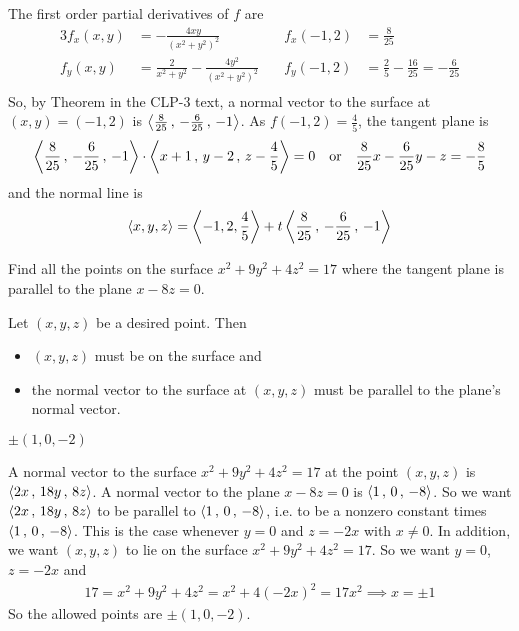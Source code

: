 \begin{solution}
The first order partial derivatives of $f$ are
\begin{alignat*}{3}
f_x(x,y) & = -\frac{4xy}{{(x^2+y^2)}^2}\quad &
      f_x(-1,2) & = \frac{8}{25} \\
f_y(x,y) & = \frac{2}{x^2+y^2}-\frac{4y^2}{{(x^2+y^2)}^2}\quad &
      f_y(-1,2) & = \frac{2}{5}-\frac{16}{25}
                  =-\frac{6}{25} \\
\end{alignat*}
So, by Theorem  in the CLP-3 text, 
a normal vector to the surface at $(x,y)=(-1,2)$ is
$\left< \frac{8}{25}\,,\,-\frac{6}{25}\,,\,-1\right>$.
As $f(-1,2)= \frac{4}{5}$, the tangent plane is
\begin{align*}
\llt \frac{8}{25}\,,\,-\frac{6}{25}\,,\,-1\rgt\cdot\llt x+1\,,\,y-2\,,\,
         z -\frac{4}{5}\rgt=0\quad \text{or}\quad
\frac{8}{25}x-\frac{6}{25}y-z=-\frac{8}{5} %
\end{align*} 
and the normal line is
\begin{align*}
\left< x,y,z\right> = \left< -1,2,\frac{4}{5}\right> 
                  +t \left< \frac{8}{25}\,,\,-\frac{6}{25}\,,\,-1\right>
\end{align*}
\end{solution}

\begin{question}[M200 2013D] %
Find all the points on the surface $x^2 + 9y^2 + 4z^2 = 17$ 
where the tangent plane is parallel to the plane $x - 8z = 0$.
\end{question}

\begin{hint}
Let $(x,y,z)$ be a desired point. Then  
\begin{itemize}\itemsep1pt \parskip0pt  %
\item 
$(x,y,z)$ must be on the surface and
\item
the normal vector to the surface at $(x,y,z)$ must be parallel to the
plane's normal vector.
\end{itemize}
\end{hint}

\begin{answer}
$\pm(1,0,-2)$
\end{answer}

\begin{solution}
A normal vector to the surface $x^2 + 9y^2 + 4z^2 = 17$
at the point $(x,y,z)$ is $\left< 2x\,,\, 18y\,,\,8z\right>$. 
A normal vector to the plane $x - 8z = 0$ is $\left< 1\,,\,0\,,\,-8\right>$.
So we want $\left< 2x\,,\, 18y\,,\,8z\right>$ to be parallel to
$\left< 1\,,\,0\,,\,-8\right>$, i.e. to be a nonzero constant times
$\left< 1\,,\,0\,,\,-8\right>$. This is the case whenever $y=0$ and $z=-2x$
with $x\ne 0$. In addition, we want $(x,y,z)$ to lie on the surface
$x^2 + 9y^2 + 4z^2 = 17$. So we want $y=0$, $z=-2x$ and
\begin{align*}
17= x^2 + 9y^2 + 4z^2 =x^2 +4(-2x)^2=17x^2
\implies x=\pm 1
\end{align*} 
So the allowed points are $\pm(1,0,-2)$.
\end{solution}

